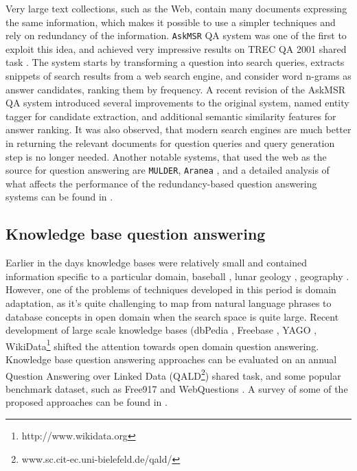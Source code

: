 Very large text collections, such as the Web, contain many documents expressing the same information, which makes it possible to use a simpler techniques and rely on redundancy of the information.
\texttt{AskMSR} QA system was one of the first to exploit this idea, and achieved very impressive results on TREC QA 2001 shared task \cite{brill2002analysis}.
The system starts by transforming a question into search queries, extracts snippets of search results from a web search engine, and consider word n-grams as answer candidates, ranking them by frequency.
A recent revision of the AskMSR QA system \cite{tsai2015web} introduced several improvements to the original system, \ie named entity tagger for candidate extraction, and additional semantic similarity features for answer ranking.
It was also observed, that modern search engines are much better in returning the relevant documents for question queries and query generation step is no longer needed.
Another notable systems, that used the web as the source for question answering are \texttt{MULDER}\cite{kwok2001scaling}, \texttt{Aranea} \cite{lin2003question}, and a detailed analysis of what affects the performance of the redundancy-based question answering systems can be found in \cite{lin2007exploration}.

\subsection{Knowledge base question answering}
\label{section:relatedwork:factoid:kbqa}

Earlier in the days knowledge bases were relatively small and contained information specific to a particular domain, \eg baseball \cite{green1961baseball}, lunar geology \cite{woods1977lunar}, geography \cite{zelle1996learning}.
However, one of the problems of techniques developed in this period is domain adaptation, as it's quite challenging to map from natural language phrases to database concepts in open domain when the search space is quite large.
Recent development of large scale knowledge bases (\eg dbPedia \cite{auer2007dbpedia}, Freebase \cite{Bollacker:2008:FCC:1376616.1376746}, YAGO \cite{suchanek2007yago}, WikiData\footnote{http://www.wikidata.org} shifted the attention towards open domain question answering.
Knowledge base question answering approaches can be evaluated on an annual Question Answering over Linked Data (QALD\footnote{www.sc.cit-ec.uni-bielefeld.de/qald/}) shared task, and some popular benchmark dataset, such as Free917 \cite{cai2013large} and WebQuestions \cite{BerantCFL13:sempre}.
A survey of some of the proposed approaches can be found in \cite{unger2014introduction}.

